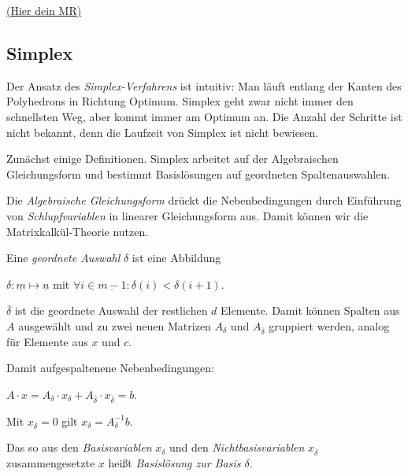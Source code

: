 \documentclass{panikzettel}
\newcommand{\mrhere}[1]{\hyperref[mrExp:#1]{\hypertarget{mr:#1}{\small\sffamily(Hier dein MR)}}}
\begin{document}
\mrhere{lp-geo}

\subsection{Simplex}

Der Ansatz des \emph{Simplex-Verfahrens} ist intuitiv: Man läuft entlang der Kanten des Polyhedrons in Richtung Optimum.
Simplex geht zwar nicht immer den schnellsten Weg, aber kommt immer am Optimum an.
Die Anzahl der Schritte ist nicht bekannt, denn die Laufzeit von Simplex ist nicht bewiesen.

Zunächst einige Definitionen.
Simplex arbeitet auf der Algebraischen Gleichungsform und bestimmt Basislösungen auf geordneten Spaltenauswahlen.

\begin{halfboxl}
Die \emph{Algebraische Gleichungsform} drückt die Nebenbedingungen durch Einführung von \emph{Schlupfvariablen} in linearer Gleichungsform aus.
Damit können wir die Matrixkalkül-Theorie nutzen.

Eine \emph{geordnete Auswahl} $\delta$ ist eine Abbildung
\begin{tightcenter}
$\delta : \underline{m} \mapsto \underline{n}$ mit $\forall i \in \underline{m-1} : \delta(i) < \delta(i+1)$.
\end{tightcenter}
$\overline{\delta}$ ist die geordnete Auswahl der restlichen $d$ Elemente.
Damit können Spalten aus $A$ ausgewählt und zu zwei neuen Matrizen $A_\delta$ und $A_{\overline{\delta}}$ gruppiert werden, analog für Elemente aus $x$ und $c$.

Damit aufgespaltenene Nebenbedingungen:
\begin{tightcenter}
$A \cdot x = A_{\delta} \cdot x_{\delta} + A_{\overline{\delta}} \cdot x_{\overline{\delta}} = b$.
\end{tightcenter}
Mit $x_{\overline{\delta}} = 0$ gilt $x_{\delta} = A_{\delta}^{-1} b$.

Das so aus den \emph{Basisvariablen} $x_{\delta}$ und den \emph{Nichtbasisvariablen} $x_{\overline{\delta}}$ zusammengesetzte $x$ heißt \emph{Basislösung zur Basis $\delta$}.

\end{halfboxl}%
\end{document}
